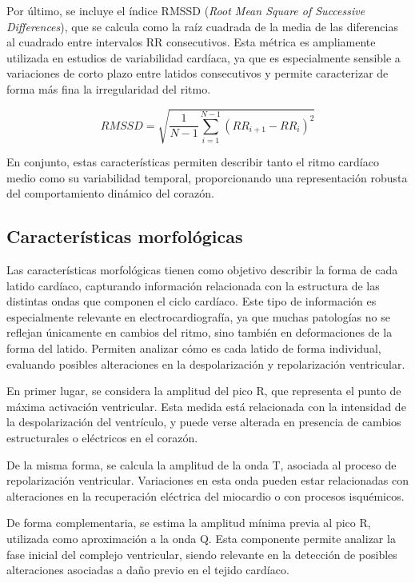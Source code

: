 \documentclass[12pt,a4paper,twoside]{book}
\begin{document}
Por último, se incluye el índice RMSSD (\textit{Root Mean Square of Successive Differences}), que se calcula como la raíz cuadrada de la media de las diferencias al cuadrado entre intervalos RR consecutivos. 
Esta métrica es ampliamente utilizada en estudios de variabilidad cardíaca, ya que es especialmente sensible a variaciones de corto plazo entre latidos consecutivos y permite caracterizar de forma más fina la irregularidad del ritmo.

\begin{equation*}
RMSSD = \sqrt{\frac{1}{N-1} \sum_{i=1}^{N-1} (RR_{i+1} - RR_i)^2}
\end{equation*}

En conjunto, estas características permiten describir tanto el ritmo cardíaco medio como su variabilidad temporal, proporcionando una representación robusta del comportamiento dinámico del corazón.

\subsection{Características morfológicas}

Las características morfológicas tienen como objetivo describir la forma de cada latido cardíaco, capturando información relacionada con la estructura de las distintas ondas que componen el ciclo cardíaco. 
Este tipo de información es especialmente relevante en electrocardiografía, ya que muchas patologías no se reflejan únicamente en cambios del ritmo, sino también en deformaciones de la forma del latido.
Permiten analizar cómo es cada latido de forma individual, evaluando posibles alteraciones en la despolarización y repolarización ventricular.

En primer lugar, se considera la amplitud del pico R, que representa el punto de máxima activación ventricular. 
Esta medida está relacionada con la intensidad de la despolarización del ventrículo, y puede verse alterada en presencia de cambios estructurales o eléctricos en el corazón.

De la misma forma, se calcula la amplitud de la onda T, asociada al proceso de repolarización ventricular. 
Variaciones en esta onda pueden estar relacionadas con alteraciones en la recuperación eléctrica del miocardio o con procesos isquémicos.

De forma complementaria, se estima la amplitud mínima previa al pico R, utilizada como aproximación a la onda Q. 
Esta componente permite analizar la fase inicial del complejo ventricular, siendo relevante en la detección de posibles alteraciones asociadas a daño previo en el tejido cardíaco.
\end{document}
